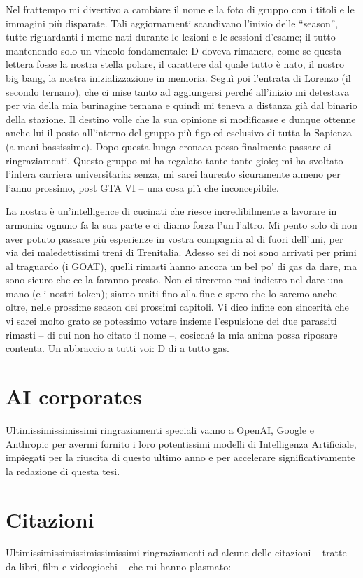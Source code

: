 Nel frattempo mi divertivo a cambiare il nome e la foto di gruppo con i
titoli e le immagini più disparate. Tali aggiornamenti scandivano
l'inizio delle ``season'', tutte riguardanti i meme nati durante le
lezioni e le sessioni d'esame; il tutto mantenendo solo un vincolo
fondamentale: D doveva rimanere, come se questa lettera fosse la nostra
stella polare, il carattere dal quale tutto è nato, il nostro big bang,
la nostra inizializzazione in memoria. Seguì poi l'entrata di Lorenzo
(il secondo ternano), che ci mise tanto ad aggiungersi perché
all'inizio mi detestava per via della mia burinagine ternana e quindi
mi teneva a distanza già dal binario della stazione. Il destino volle
che la sua opinione si modificasse e dunque ottenne anche lui il posto
all'interno del gruppo più figo ed esclusivo di tutta la Sapienza (a
mani bassissime). Dopo questa lunga cronaca posso finalmente passare ai
ringraziamenti. Questo gruppo mi ha regalato tante tante gioie; mi ha
svoltato l'intera carriera universitaria: senza, mi sarei laureato
sicuramente almeno per l'anno prossimo, post GTA VI -- una cosa pi\`u che inconcepibile.

La nostra è un'intelligence di cucinati che riesce incredibilmente a
lavorare in armonia: ognuno fa la sua parte e ci diamo forza l'un
l'altro. Mi pento solo di non aver potuto passare più esperienze in
vostra compagnia al di fuori dell'uni, per via dei maledettissimi treni
di Trenitalia. Adesso sei di noi sono arrivati per primi al traguardo
(i GOAT), quelli rimasti hanno ancora un bel po' di gas da dare, ma
sono sicuro che ce la faranno presto. Non ci tireremo mai indietro nel
dare una mano (e i nostri token); siamo uniti fino alla fine e spero
che lo saremo anche oltre, nelle prossime season dei prossimi capitoli.
Vi dico infine con sincerità che vi sarei molto grato se potessimo
votare insieme l'espulsione dei due parassiti rimasti -- di cui non ho
citato il nome --, cosicché la mia anima possa riposare contenta. Un
abbraccio a tutti voi: D di a tutto gas.

\section{AI corporates}
Ultimissimissimissimi ringraziamenti speciali vanno a OpenAI, Google e
Anthropic per avermi fornito i loro potentissimi modelli di
Intelligenza Artificiale, impiegati per la riuscita di questo ultimo
anno e per accelerare significativamente la redazione di questa tesi.

\section{Citazioni}
Ultimissimissimissimissimissimi ringraziamenti ad alcune delle
citazioni -- tratte da libri, film e videogiochi -- che mi hanno
plasmato:

